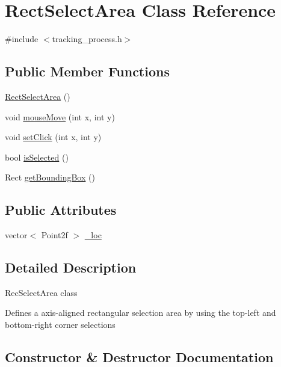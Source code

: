 \hypertarget{class_rect_select_area}{}\section{Rect\+Select\+Area Class Reference}
\label{class_rect_select_area}


{\ttfamily \#include $<$tracking\+\_\+process.\+h$>$}

\subsection*{Public Member Functions}
\begin{DoxyCompactItemize}
\item 
\hyperlink{class_rect_select_area_ad9997b0992c89405457b2adc75c685cd}{Rect\+Select\+Area} ()
\item 
void \hyperlink{class_rect_select_area_ab95e2ef179e1bd6659ab5d09aedab066}{mouse\+Move} (int x, int y)
\item 
void \hyperlink{class_rect_select_area_a3215429d108eb259c8b1c68d5a28af01}{set\+Click} (int x, int y)
\item 
bool \hyperlink{class_rect_select_area_a7a9ca80bf2125c894b94176ab42fefa1}{is\+Selected} ()
\item 
Rect \hyperlink{class_rect_select_area_a9e1cb4be9df22d4654a4b9221aac5496}{get\+Bounding\+Box} ()
\end{DoxyCompactItemize}
\subsection*{Public Attributes}
\begin{DoxyCompactItemize}
\item 
vector$<$ Point2f $>$ \hyperlink{class_rect_select_area_a0fc2f938515d1507e4dfc75fcc2059f1}{\+\_\+loc}
\end{DoxyCompactItemize}


\subsection{Detailed Description}
Rec\+Select\+Area class

Defines a axis-\/aligned rectangular selection area by using the top-\/left and bottom-\/right corner selections 

\subsection{Constructor \& Destructor Documentation}
